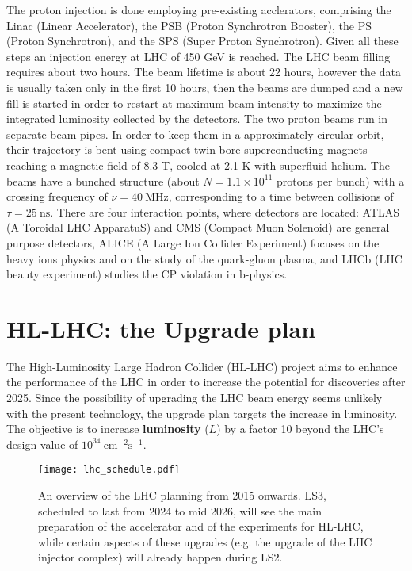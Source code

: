 \documentclass[12pt,twoside,a4paper]{report}
\numberwithin{equation}{section}
\begin{document}
The proton injection is done employing pre-existing acclerators, comprising the Linac (Linear Accelerator), the PSB (Proton Synchrotron Booster), the PS (Proton Synchrotron), and the SPS (Super Proton Synchrotron). Given all these steps an injection energy at LHC of 450 GeV is reached. The LHC beam filling requires about two hours. The beam lifetime is about 22 hours, however the data is usually taken only in the first 10 hours, then the beams are dumped and a new fill is started in order to restart at maximum beam intensity to maximize the integrated luminosity collected by the detectors.
The two proton beams run in separate beam pipes. In order to keep them in a approximately circular orbit, their trajectory is bent using compact twin-bore superconducting magnets reaching a magnetic field of 8.3 T, cooled at 2.1 K with superfluid helium.
The beams have a bunched structure (about $N = 1.1 \times 10^{11}$ protons per bunch) with a crossing frequency of $\nu = 40\ \mathrm{MHz}$, corresponding to a time between collisions of $\tau = 25\ \mathrm{ns}$.
There are four interaction points, where detectors are located: ATLAS (A Toroidal LHC ApparatuS) and CMS (Compact Muon Solenoid) are general purpose detectors, ALICE (A Large Ion Collider Experiment) focuses on the heavy ions physics and on the study of the quark-gluon plasma, and LHCb (LHC beauty experiment) studies the CP violation in b-physics.

\section{HL-LHC: the Upgrade plan}
The High-Luminosity Large Hadron Collider (HL-LHC) project aims to enhance the performance of the LHC in order to increase the potential for discoveries after 2025. Since the possibility of upgrading the LHC beam energy seems unlikely with the present technology, the upgrade plan targets the increase in luminosity. The objective is to increase \textbf{luminosity} ($L$) by a factor 10 beyond the LHC’s design value of $10^{34}\ \mathrm{cm^{-2}s^{-1}}$.
\begin{figure}[!htb]
\texttt{[image: lhc\_schedule.pdf]}
\caption{\label{fig:planning} An overview of the LHC planning from 2015 onwards. LS3, scheduled to last from 2024 to mid 2026, will see the main preparation of the accelerator and of the experiments for HL-LHC, while certain aspects of these upgrades (e.g. the upgrade of the LHC injector complex) will already happen during LS2.}
\end{figure}
\end{document}
